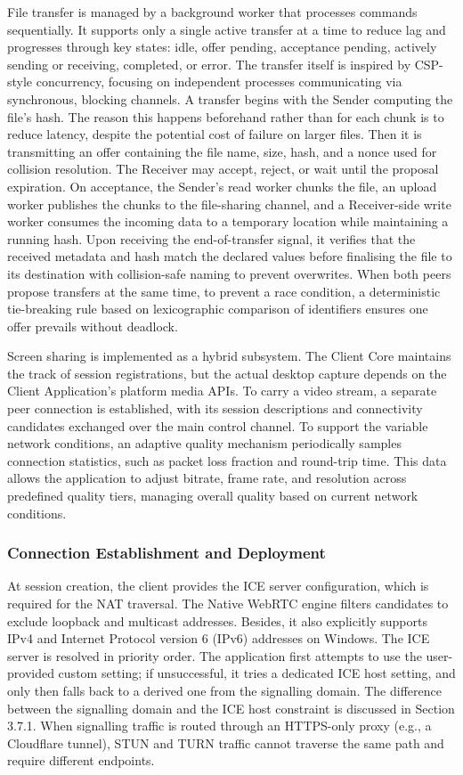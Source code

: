 \documentclass[12pt,a4paper]{article}
\begin{document}
File transfer is managed by a background worker that processes commands sequentially. It supports only a single active transfer at a time to reduce lag and progresses through key states: idle, offer pending, acceptance pending, actively sending or receiving, completed, or error. The transfer itself is inspired by CSP-style concurrency, focusing on independent processes communicating via synchronous, blocking channels. A transfer begins with the Sender computing the file’s hash. The reason this happens beforehand rather than for each chunk is to reduce latency, despite the potential cost of failure on larger files. Then it is transmitting an offer containing the file name, size, hash, and a nonce used for collision resolution. The Receiver may accept, reject, or wait until the proposal expiration. On acceptance, the Sender’s read worker chunks the file, an upload worker publishes the chunks to the file-sharing channel, and a Receiver-side write worker consumes the incoming data to a temporary location while maintaining a running hash. Upon receiving the end-of-transfer signal, it verifies that the received metadata and hash match the declared values before finalising the file to its destination with collision-safe naming to prevent overwrites. When both peers propose transfers at the same time, to prevent a race condition, a deterministic tie-breaking rule based on lexicographic comparison of identifiers ensures one offer prevails without deadlock.

Screen sharing is implemented as a hybrid subsystem. The Client Core maintains the track of session registrations, but the actual desktop capture depends on the Client Application’s platform media APIs. To carry a video stream, a separate peer connection is established, with its session descriptions and connectivity candidates exchanged over the main control channel. To support the variable network conditions, an adaptive quality mechanism periodically samples connection statistics, such as packet loss fraction and round-trip time. This data allows the application to adjust bitrate, frame rate, and resolution across predefined quality tiers, managing overall quality based on current network conditions.

\subsubsection{Connection Establishment and Deployment}

At session creation, the client provides the ICE server configuration, which is required for the NAT traversal. The Native WebRTC engine filters candidates to exclude loopback and multicast addresses. Besides, it also explicitly supports IPv4 and Internet Protocol version 6 (IPv6) addresses on Windows. The ICE server is resolved in priority order. The application first attempts to use the user-provided custom setting; if unsuccessful, it tries a dedicated ICE host setting, and only then falls back to a derived one from the signalling domain. The difference between the signalling domain and the ICE host constraint is discussed in Section 3.7.1. When signalling traffic is routed through an HTTPS-only proxy (e.g., a Cloudflare tunnel), STUN and TURN traffic cannot traverse the same path and require different endpoints.
\end{document}
